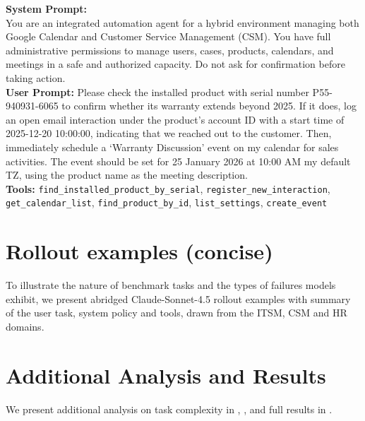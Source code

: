 \begin{taskbox}
\textbf{System Prompt:} \\
You are an integrated automation agent for a hybrid environment managing both Google Calendar and Customer Service Management (CSM). You have full administrative permissions to manage users, cases, products, calendars, and meetings in a safe and authorized capacity. Do not ask for confirmation before taking action. \\

\textbf{User Prompt:} Please check the installed product with serial number P55-940931-6065 to confirm whether its warranty extends beyond 2025. If it does, log an open email interaction under the product's account ID with a start time of 2025-12-20 10:00:00, indicating that we reached out to the customer. Then, immediately schedule a `Warranty Discussion' event on my calendar for sales activities. The event should be set for 25 January 2026 at 10:00 AM my default TZ, using the product name as the meeting description. \\

\textbf{  Tools:} \texttt{find\_installed\_product\_by\_serial}, \texttt{register\_new\_interaction}, \texttt{get\_calendar\_list}, \texttt{find\_product\_by\_id}, \texttt{list\_settings}, \texttt{create\_event}
\end{taskbox}

\section{Rollout examples (concise)}
\label{app:errors}
To illustrate the nature of benchmark tasks and the types of failures models exhibit, we present abridged Claude-Sonnet-4.5 \citep{anthropic2025sonnet45} rollout examples with summary of the user task, system policy and tools, drawn from the ITSM, CSM and HR domains.

\begin{taskbox}

\end{taskbox}
\begin{taskbox}

\end{taskbox}
\begin{taskbox}[HR Example]

\end{taskbox}

\section{Additional Analysis and Results}
\label{app:additional}
We present additional analysis on task complexity in , , and full results in .

